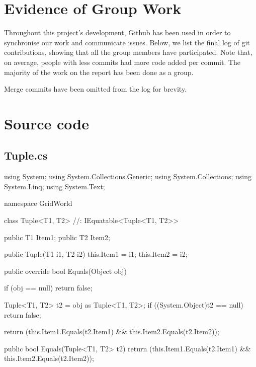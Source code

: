 \documentclass[11pt]{article}
\begin{document}
\newpage
\appendix

\section{Evidence of Group Work}
Throughout this project's development, Github has been used in order to synchronise our work and communicate issues. Below, we list the final log of git contributions, showing that all the group members have participated. Note that, on average, people with less commits had more code added per commit. The majority of the work on the report has been done as a group.

Merge commits have been omitted from the log for brevity.

\section{Source code}

\subsection*{Tuple.cs}
\begin{code}
using System;
using System.Collections.Generic;
using System.Collections;
using System.Linq;
using System.Text;

namespace GridWorld
{
    class Tuple<T1, T2> //: IEquatable<Tuple<T1, T2>>
    {
        public T1 Item1;
        public T2 Item2;

        public Tuple(T1 i1, T2 i2) {
            this.Item1 = i1;
            this.Item2 = i2;
        }
   
        public override bool Equals(Object obj) {
            if (obj == null)
            {
                return false;
            }

            Tuple<T1, T2> t2 = obj as Tuple<T1, T2>;
            if ((System.Object)t2 == null)
            {
                return false;
            }
            
            return (this.Item1.Equals(t2.Item1) && this.Item2.Equals(t2.Item2));
        }

        public bool Equals(Tuple<T1, T2> t2)
        {
            return (this.Item1.Equals(t2.Item1) && this.Item2.Equals(t2.Item2));
        }
    }
}
\end{code}
\end{document}
